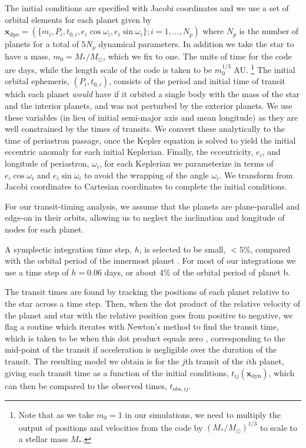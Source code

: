 \documentclass[fleqn,usenatbib]{mnras} %
\begin{document}
The initial conditions are specified with Jacobi coordinates and
we use a set of orbital elements for each planet given by
$\mathbf{x}_{dyn} = (\{m_i,P_i,t_{0,i},e_i \cos{\omega_i},e_i\sin{\omega_i}\}; i = 1,...,N_p)$ 
where $N_p$ is the number of planets for a total of $5N_p$ dynamical parameters. In
addition we take the star to have a mass, $m_0 = M_*/M_\odot$, which we fix to one.
The units of time for the code are days, while the length scale of the code is taken to be $m_0^{1/3}$ AU. \footnote{Note that as we take $m_0=1$ in our simulations, we need to multiply
the output of positions and velocities from the code by $(M_*/M_\odot)^{1/3}$ to scale to a stellar mass $M_*$.}
The initial orbital ephemeris, $(P_i,t_{0,i})$, consists of the period and initial time of
transit which each planet {\it would} have if it orbited a single
body with the mass of the star and the interior planets, and was
not perturbed by the exterior planets.  We use these variables (in lieu of initial semi-major axis and mean longitude) as
they are well constrained by the times of transits.  We convert
these analytically to the time of periastron passage, once the
Kepler equation is solved to yield the initial eccentric anomaly
for each initial Keplerian.  Finally, the eccentricity, $e_i$, and
longitude of periastron, $\omega_i$, for each Keplerian we
parameterize in terms of $e_i\cos{\omega_i}$ and $e_i\sin{\omega_i}$
to avoid the wrapping of the angle $\omega_i$.   We transform from Jacobi coordinates to Cartesian coordinates to complete the initial conditions.

For our transit-timing analysis, we assume that the planets are
plane-parallel and edge-on in their orbits, allowing us to neglect
the inclination and longitude of nodes for each planet.

A symplectic integration time step, $h$, is selected to be small,
${<} 5$\%, compared with the orbital period of the innermost planet
\citep{Wisdom1991}. For most of our integrations we use a time step 
of $h=0.06$ days, or about 4\% of the orbital period of planet b.

The transit times are found by tracking the positions of each
planet relative to the star across a time step.  Then, when the
dot product of the relative velocity of the planet and star
with the relative position goes from positive to negative,
we flag a routine which iterates with Newton's method to find
the transit time, which is taken to be when this dot product
equals zero \citep{Fabrycky2010}, corresponding to the mid-point 
of the transit if acceleration is negligible over the duration of the 
transit.  The resulting model we obtain
is for the $j$th transit of the $i$th planet, giving each
transit time as a function of the initial conditions, $t_{ij}(\mathbf{x}_\mathrm{dyn})$, which can then be compared to the observed times, $t_{\mathrm{obs},ij}$.
\end{document}
